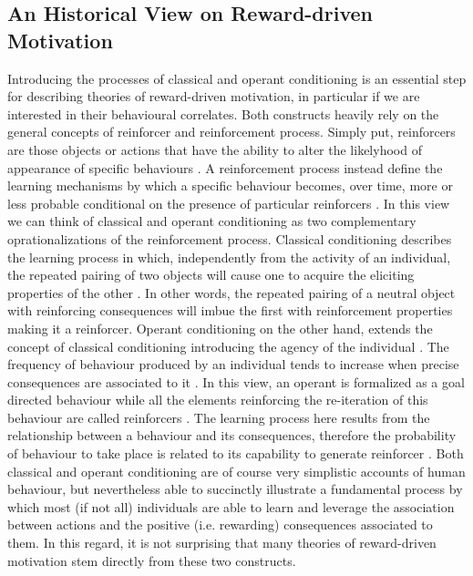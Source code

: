 \subsection{An Historical View on Reward-driven Motivation}
\label{motivation_hist}
Introducing the processes of classical and operant conditioning is an essential step for describing theories of reward-driven motivation, in particular if we are interested in their behavioural correlates. Both constructs heavily rely on the general concepts of reinforcer and reinforcement process. Simply put, reinforcers are those objects or actions that have the ability to alter the likelyhood of appearance of specific behaviours \cite{kling1971woodworth,skinner1953science,squire2012fundamental}. A reinforcement process instead define the learning mechanisms by which a specific behaviour becomes, over time, more or less probable conditional on the presence of particular reinforcers \cite{kling1971woodworth}. In this view we can think of classical and operant conditioning as two complementary oprationalizations of the reinforcement process. 
Classical conditioning describes the learning process in which, independently from the activity of an individual, the repeated pairing of two objects will cause one to acquire the eliciting properties of the other \cite{squire2012fundamental}. In other words, the repeated pairing of a neutral object with reinforcing consequences will imbue the first with reinforcement properties making it a reinforcer. 
Operant conditioning on the other hand, extends the concept of classical conditioning introducing the agency of the individual \cite{skinner1953science}. The frequency of behaviour produced by an individual tends to increase when precise consequences are associated to it \cite{skinner1953science}. In this view, an operant is formalized as a goal directed behaviour while all the elements reinforcing the re-iteration of this behaviour are called reinforcers \cite{skinner1953science}. The learning process here results from the relationship between a behaviour and its consequences, therefore the probability of behaviour to take place is related to its capability to generate reinforcer \cite{kling1971woodworth}. 
Both classical and operant conditioning are of course very simplistic accounts of human behaviour, but nevertheless able to succinctly illustrate a fundamental process by which most (if not all) individuals are able to learn and leverage the association between actions and the positive (i.e. rewarding) consequences associated to them. In this regard, it is not surprising that many theories of reward-driven motivation stem directly from these two constructs. 

